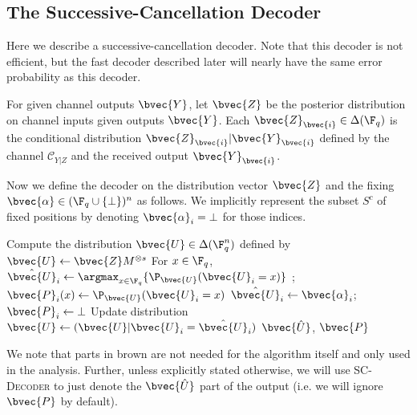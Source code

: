 \documentclass[11pt]{article}
\begin{document}
\subsection{The Successive-Cancellation Decoder}
\label{sec:sc-decoder}
Here we describe a successive-cancellation decoder.
Note that this decoder is not efficient,
but the fast decoder described later will nearly have the same error probability
as this decoder.

For given channel outputs $\bvec{Y}$,
let $\bvec{Z}$ be the posterior distribution
on channel inputs given outputs $\bvec{Y}$.
Each $\bvec{Z}_{\bvec{i}} \in \Delta(\F_q)$ is the conditional distribution
$\bvec{Z}_\bvec{i} | \bvec{Y}_\bvec{i}$ defined by the channel
$\mathcal{C}_{Y|Z}$ and the received output $\bvec{Y}_\bvec{i}$.

Now we define the decoder on the distribution vector $\bvec{Z}$ and the fixing 
$\bvec{\alpha} \in (\F_q \cup \{\bot\})^n$ as follows. We implicitly represent the subset $S^c$ of fixed positions by denoting $\bvec{\alpha}_i=\bot$ for those indices. 


\begin{algorithm}[H]
	\caption{Successive-Cancellation Decoder}
	\label{algo:sc-decoder}
	\begin{algorithmic}[1]
		\State Compute the 
		distribution $\bvec{U} \in \Delta(\F_q^n)$ defined by $ \bvec{U} \leftarrow \bvec{Z} M^{\otimes s}$
		 \label{line:for-loop-scd}
		\State For $x \in \F_q$, $\hat{\bvec{U}}_i \gets \argmax_{x \in \F_q} \{\P_{\bvec{U}}(\bvec{U}_i = x)\}$ ;~~{\color{brown} $\bvec{P}_i(x) \gets \P_{\bvec{U}}(\bvec{U}_i = x)$} \label{line:scd-x}
		\Else
		\State $\hat{\bvec{U}}_i \gets \bvec{\alpha}_i$; {\color{brown} $\bvec{P}_i \gets \bot$}
		\EndIf
		\State Update distribution $\bvec{U} \leftarrow (\bvec{U} | \bvec{U}_i = \hat{\bvec{U}}_i)$ \label{line:update-U-scd}
		\EndFor
		\State \Return $\bvec{\hat U}$, {\color{brown} $\bvec{P}$}
		\EndProcedure
	\end{algorithmic}
\end{algorithm}

\begin{remark}
\label{rem:brown-part-sc-decoder}
    We note that parts in {\color{brown} brown} are not needed for the algorithm itself and only used in the analysis. Further, unless explicitly stated otherwise, we will use \textsc{SC-Decoder} to just denote the $\bvec{\hat U}$ part of the output (i.e. we will ignore {\color{brown} $\bvec{P}$} by default).
\end{remark}
\end{document}
